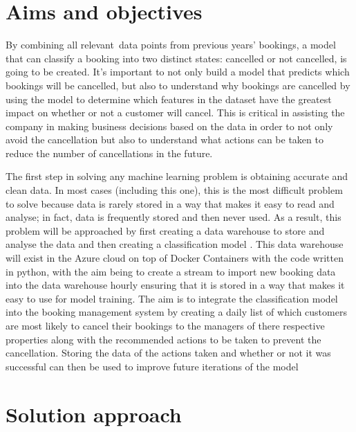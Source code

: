 \section{Aims and objectives}

By combining all relevant data points from previous years' bookings, a model that can classify a booking into two distinct states: cancelled or not cancelled, is going to be created. It's important to not only build a model that predicts which bookings will be cancelled, but also to understand why bookings are cancelled by using the model to determine which features in the dataset have the greatest impact on whether or not a customer will cancel. This is critical in assisting the company in making business decisions based on the data in order to not only avoid the cancellation but also to understand what actions can be taken to reduce the number of cancellations in the future.

\vspace{5mm}

The first step in solving any machine learning problem is obtaining accurate and clean data. In most cases (including this one), this is the most difficult problem to solve because data is rarely stored in a way that makes it easy to read and analyse; in fact, data is frequently stored and then never used. As a result, this problem will be approached by first creating a data warehouse to store and analyse the data and then creating a classification model \cite{SessionsTHEALGORITHMS}. This data warehouse will exist in the Azure cloud on top of Docker Containers with the code written in python, with the aim being to create a stream to import new booking data into the data warehouse hourly ensuring that it is stored in a way that makes it easy to use for model training. The aim is to integrate the classification model into the booking management system by creating a daily list of which customers are most likely to cancel their bookings to the managers of there respective properties along with the recommended actions to be taken to prevent the cancellation. Storing the data of the actions taken and whether or not it was successful can then be used to improve future iterations of the model

\section{Solution approach}

